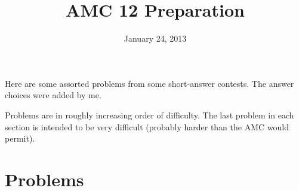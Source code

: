 \documentclass[11pt]{scrartcl}
\begin{document}
\title{AMC 12 Preparation}
\date{January 24, 2013}
\maketitle

Here are some assorted problems from some short-answer contests.  The answer choices were added by me.

Problems are in roughly increasing order of difficulty.  The last problem in each section is intended to be very difficult (probably harder than the AMC would permit).

\newcommand{\choices}[5]{\par $\hspace*{1.337ex} \textbf{(A)}\ #1 \hfill \textbf{(B)}\ #2 \hfill \textbf{(C)}\ #3 \hfill \textbf{(D)}\ #4 \hfill \textbf{(E)}\ #5 \hspace*{1.337ex}$}

\section{Problems}
\end{document}
